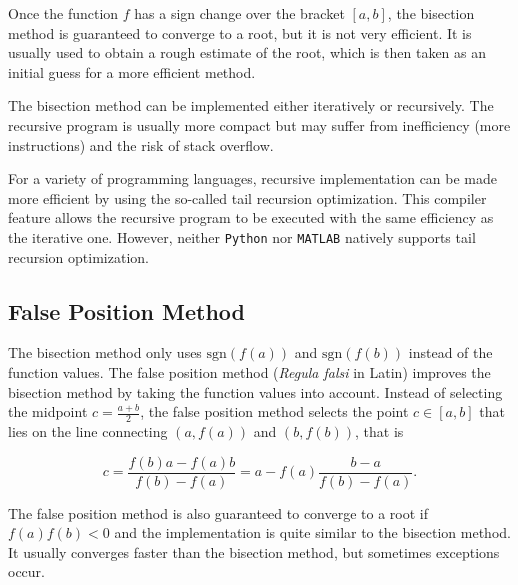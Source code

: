 Once the function $f$ has a sign change over the bracket $[a, b]$, the bisection method is guaranteed to converge to a root, but it is not very efficient. It is usually used to obtain a rough estimate of the root, which is then taken as an initial guess for a more efficient method.

\begin{remark}
The bisection method can be implemented either iteratively or recursively. The recursive program is usually more compact but may suffer from inefficiency (more instructions) and the risk of stack overflow.

For a variety of programming languages, recursive implementation can be made more efficient by using the so-called tail recursion optimization. This compiler feature allows the recursive program to be executed with the same efficiency as the iterative one. However, neither \texttt{Python} nor \texttt{MATLAB} natively supports tail recursion optimization.
\end{remark}

\subsection{False Position Method}
\label{SSec: 0-Fa-Po-Me}
The bisection method only uses $\text{sgn}(f(a))$ and $\text{sgn}(f(b))$ instead of the function values. The false position method (\emph{Regula falsi} in Latin) improves the bisection method by taking the function values into account. Instead of selecting the midpoint $c = \frac{a + b}{2}$, the false position method selects the point $c\in[a, b]$ that lies on the line connecting $(a, f(a))$ and $(b, f(b))$, that is

$$c = \frac{f(b) a - f(a) b}{f(b) - f(a)} = a - f(a)\frac{b - a}{f(b) - f(a)}.$$

The false position method is also guaranteed to converge to a root if $f(a)f(b) < 0$ and the implementation is quite similar to the bisection method. It usually converges faster than the bisection method, but sometimes exceptions occur.

